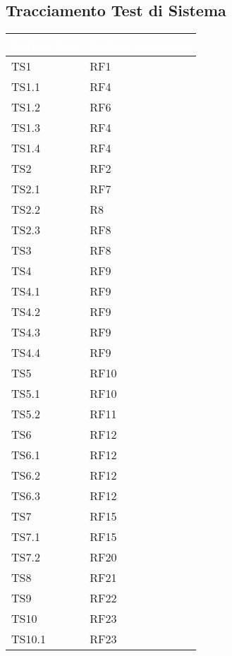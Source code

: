 \subsection{Tracciamento Test di Sistema}

{
    \setlength{\freewidth}{\dimexpr\textwidth-10\tabcolsep}
    \renewcommand{\arraystretch}{1.5}
    \centering
    \setlength{\aboverulesep}{0pt}
    \setlength{\belowrulesep}{0pt}
    \begin{longtable}{C{.25\freewidth} C{.25\freewidth}}
       \toprule
    \textcolor{white}{\textbf{Codice Test}}&
    \textcolor{white}{\textbf{Codice caso d'uso}}\\
    \toprule
    \endhead

    TS1 & RF1  \\  TS1.1 & RF4  \\   TS1.2 & RF6  \\  TS1.3 & RF4  \\
    TS1.4 & RF4  \\  TS2 & RF2  \\   TS2.1 & RF7  \\  TS2.2 & R8  \\
    TS2.3 & RF8  \\  TS3 & RF8  \\   TS4 & RF9  \\  TS4.1 & RF9  \\
    TS4.2 & RF9  \\  TS4.3 & RF9  \\   TS4.4 & RF9  \\  TS5 & RF10  \\
    TS5.1 & RF10  \\  TS5.2 & RF11  \\   TS6 & RF12  \\  TS6.1 & RF12  \\
    TS6.2 & RF12  \\  TS6.3 & RF12  \\   TS7 & RF15  \\  TS7.1 & RF15  \\
    TS7.2 & RF20  \\  TS8 & RF21  \\      TS9 & RF22  \\    TS10 & RF23  \\
    TS10.1 & RF23  \\
    
    \bottomrule
\end{longtable}
}

